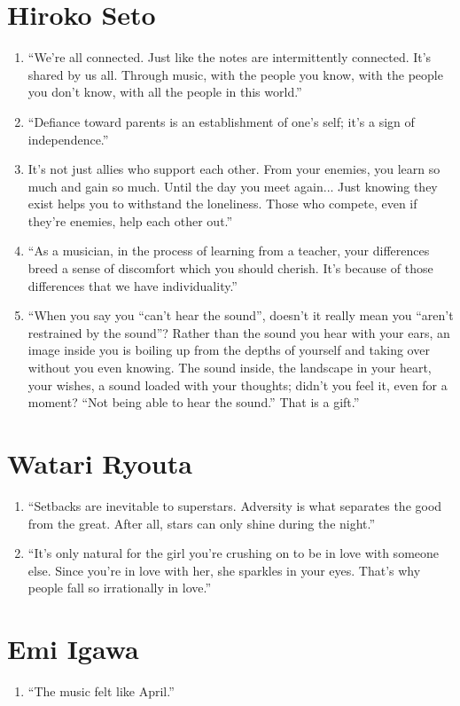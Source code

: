 \documentclass{book}
\numberwithin{equation}{section}
\begin{document}
\section{Hiroko Seto}
\begin{enumerate}
    \item ``We're all connected. Just like the notes are intermittently connected. It's shared by us all. Through music, with the people you know, with the people you don't know, with all the people in this world.''
    \item ``Defiance toward parents is an establishment of one's self; it's a sign of independence.''
    \item It's not just allies who support each other. From your enemies, you learn so much and gain so much. Until the day you meet again... Just knowing they exist helps you to withstand the loneliness. Those who compete, even if they're enemies, help each other out.''
    \item ``As a musician, in the process of learning from a teacher, your differences breed a sense of discomfort which you should cherish. It's because of those differences that we have individuality.''
    \item ``When you say you ``can't hear the sound'', doesn't it really mean you ``aren't restrained by the sound''? Rather than the sound you hear with your ears, an image inside you is boiling up from the depths of yourself and taking over without you even knowing. The sound inside, the landscape in your heart, your wishes, a sound loaded with your thoughts; didn't you feel it, even for a moment? ``Not being able to hear the sound.'' That is a gift.''
\end{enumerate}

\section{Watari Ryouta}
\begin{enumerate}
    \item ``Setbacks are inevitable to superstars. Adversity is what separates the good from the great. After all, stars can only shine during the night.''
    \item ``It's only natural for the girl you're crushing on to be in love with someone else. Since you're in love with her, she sparkles in your eyes. That's why people fall so irrationally in love.''
\end{enumerate}

\section{Emi Igawa}
\begin{enumerate}
    \item``The music felt like April.''
\end{enumerate}
\end{document}
